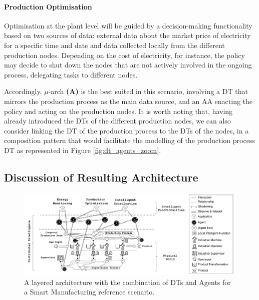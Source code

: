 \paragraph{Production Optimisation}

Optimisation at the plant level will be guided by a decision-making functionality based on two sources of data: external data about the market price of electricity for a specific time and date
and data collected locally from the different production nodes. %
%
Depending on the cost of electricity, for instance, the policy may decide to shut down the nodes that are not actively involved in the ongoing process, delegating tasks to different nodes.

Accordingly, $\mu$-arch \textbf{(A)} is the best suited in this scenario, involving a DT that mirrors the production process as the main data source, and an AA enacting the policy and acting on the production nodes.
%
It is worth noting that, having already introduced the DTs of the different production nodes, we can also consider linking the DT of the production process to the DTs of the nodes, in a composition pattern that would facilitate the modelling of the production process DT as represented in Figure \ref{fig:dt_agents_zoom}.

\subsection{Discussion of Resulting Architecture}


\begin{figure}[!b]
    \centering
    \includegraphics[width=\columnwidth]{figures/dt-mas/dt_agents_smart_manufacturing.pdf}
    \caption{A layered architecture with the combination of DTs and Agents for a Smart Manufacturing reference scenario.}
    \label{fig:dt_agents_smart_manufacturing}
\end{figure}

